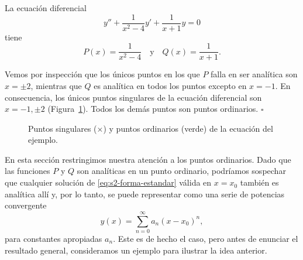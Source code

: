 \begin{example}
    La ecuación diferencial
\[ y'' + \frac{1}{x^2 - 4}y' + \frac{1}{x + 1}y = 0 \]
tiene
\[ P(x) = \frac{1}{x^2 - 4} \quad \text{y} \quad Q(x) = \frac{1}{x + 1}. \]
 
Vemos por inspección que los únicos puntos en los que $P$ falla en ser analítica son $x = \pm 2$, mientras que $Q$ es analítica en todos los puntos excepto en $x = -1$. En consecuencia, los únicos puntos singulares de la ecuación diferencial son $x = -1, \pm 2$ (Figura~\ref{fig:s2-singulares}). Todos los demás puntos son puntos ordinarios. \hfill $\square$
\end{example}
 
\begin{figure}[H]
\centering
{}
\caption{Puntos singulares ($\times$) y puntos ordinarios (verde) de la ecuación del ejemplo.}
\label{fig:s2-singulares}
\end{figure}
 
\begin{remark}
    En esta sección restringimos nuestra atención a los puntos ordinarios. Dado que las funciones $P$ y $Q$ son analíticas en un punto ordinario, podríamos sospechar que cualquier solución de \eqref{eq:s2-forma-estandar} válida en $x = x_0$ también es analítica allí y, por lo tanto, se puede representar como una serie de potencias convergente
\[ y(x) = \sum_{n=0}^{\infty} a_n(x - x_0)^n, \]
para constantes apropiadas $a_n$. Este es de hecho el caso, pero antes de enunciar el resultado general, consideramos un ejemplo para ilustrar la idea anterior.
\end{remark}
 
